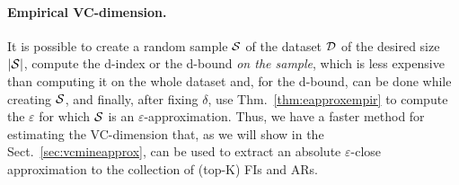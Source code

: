 \paragraph{Empirical VC-dimension.} 
It is possible to create a random sample ${\cal S}$ of the dataset
${\cal D}$ of the desired size $|{\cal S}|$, compute the d-index or the d-bound \emph{on
the sample}, which is less expensive than computing it on the
whole dataset and, for the d-bound, can be done while creating ${\cal S}$, and
finally, after fixing $\delta$, use Thm.~\ref{thm:eapproxempir} to compute the
$\varepsilon$ for which ${\cal S}$ is an $\varepsilon$-approximation. Thus, 
we have a faster method for estimating the VC-dimension that, 
as we will show in the Sect.~\ref{sec:vcmineapprox}, can be used to extract an absolute
$\varepsilon$-close approximation to the collection of (top-K) FIs and ARs.

